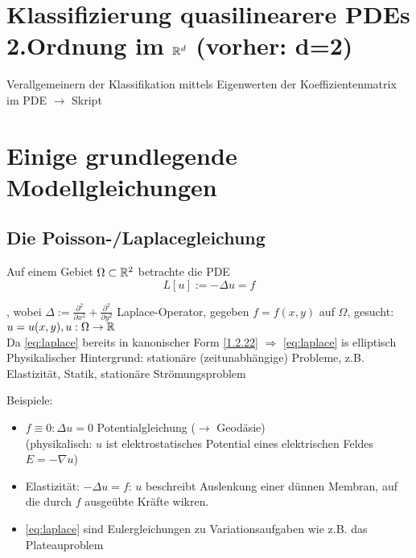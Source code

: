 \section{Klassifizierung quasilinearere PDEs 2.Ordnung im $\mathbb{R}^d$ (vorher: d=2)} %
Verallgemeinern der Klassifikation mittels Eigenwerten der Koeffizientenmatrix im PDE $\to$ Skript

\section{Einige grundlegende Modellgleichungen} %
\subsection{Die Poisson-/Laplacegleichung}
Auf einem Gebiet $\Omega \subset \mathbb{R}^2$  betrachte die PDE 
\begin{equation} %
    L[u] := -\Delta u = f
    \label{eq:laplace}
\end{equation}

, wobei $\Delta:= \frac{\partial^2}{\partial x^2} + \frac{\partial^2}{\partial y^2}$ Laplace-Operator, gegeben $f=f(x,y)$ auf $\Omega$, gesucht: $u=u(x,y), u: \Omega\to\mathbb{R}$\\

Da \eqref{eq:laplace} bereits in kanonischer Form \eqref{1.2.22} $\Rightarrow$ \eqref{eq:laplace} is elliptisch\\

Physikalischer Hintergrund: stationäre (zeitunabhängige) Probleme, z.B. Elastizität, Statik, stationäre Strömungsproblem

Beispiele:
\begin{itemize}
    \item $f \equiv 0: \Delta u= 0$ Potentialgleichung ($\to$ Geodäsie)\\
        (physikalisch: $u$ ist elektrostatisches Potential eines elektrischen Feldes $E=-\nabla u$)
    \item Elastizität: $-\Delta u = f$: $u$ beschreibt Auslenkung einer dünnen Membran, auf die durch $f$ ausgeübte Kräfte wikren.
    \item \eqref{eq:laplace} sind Eulergleichungen zu Variationsaufgaben wie z.B. das Plateauproblem
\end{itemize}

